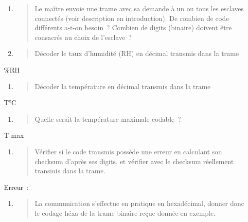 \begin{enumerate}
\def\labelenumi{\arabic{enumi}.}
\item
  \begin{quote}
  Le maître envoie une trame avec sa demande à un ou tous les esclaves
  connectés (voir description en introduction). De combien de code
  différents a-t-on besoin~? Combien de digits (binaire) doivent être
  consacrés au choix de l'esclave~?
  \end{quote}
\item
  \begin{quote}
  Décoder le taux d'humidité (RH) en décimal transmis dans la trame
  \end{quote}
\end{enumerate}

\%RH

\begin{enumerate}
\def\labelenumi{\arabic{enumi}.}
\setcounter{enumi}{2}
\item
  \begin{quote}
  Décoder la température en décimal transmis dans la trame
  \end{quote}
\end{enumerate}

T°C

\begin{enumerate}
\def\labelenumi{\arabic{enumi}.}
\setcounter{enumi}{3}
\item
  \begin{quote}
  Quelle serait la température maximale codable~?
  \end{quote}
\end{enumerate}

T max

\begin{enumerate}
\def\labelenumi{\arabic{enumi}.}
\setcounter{enumi}{4}
\item
  \begin{quote}
  Vérifier si le code transmis possède une erreur en calculant son
  checksum d'après ses digits, et vérifier avec le checksum réellement
  transmis dans la trame.
  \end{quote}
\end{enumerate}

Erreur~:

\begin{enumerate}
\def\labelenumi{\arabic{enumi}.}
\setcounter{enumi}{5}
\item
  \begin{quote}
  La communication s'effectue en pratique en hexadécimal, donner donc le
  codage héxa de la trame binaire reçue donnée en exemple.
  \end{quote}
\end{enumerate}

